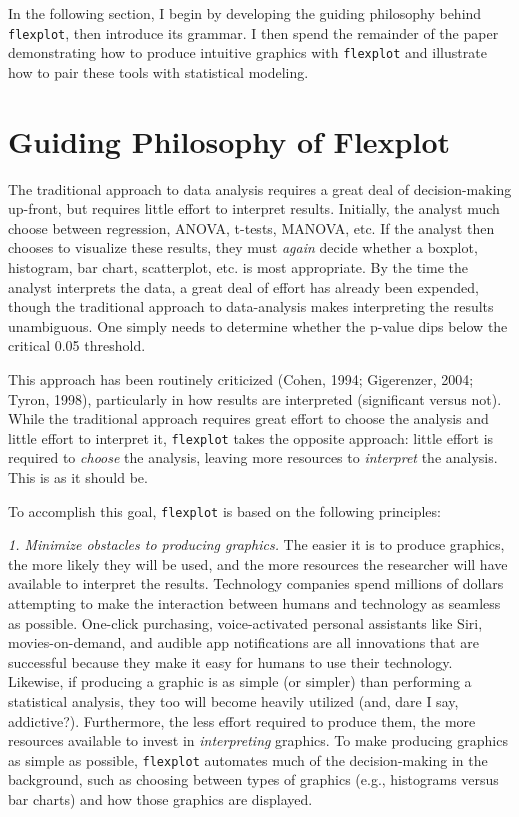 \documentclass[
  man]{apa6}
\begin{document}
In the following section, I begin by developing the guiding philosophy behind \texttt{flexplot}, then introduce its grammar. I then spend the remainder of the paper demonstrating how to produce intuitive graphics with \texttt{flexplot} and illustrate how to pair these tools with statistical modeling.

\hypertarget{guiding-philosophy-of-flexplot}{%
\section{Guiding Philosophy of Flexplot}\label{guiding-philosophy-of-flexplot}}

The traditional approach to data analysis requires a great deal of decision-making up-front, but requires little effort to interpret results. Initially, the analyst much choose between regression, ANOVA, t-tests, MANOVA, etc. If the analyst then chooses to visualize these results, they must \emph{again} decide whether a boxplot, histogram, bar chart, scatterplot, etc. is most appropriate. By the time the analyst interprets the data, a great deal of effort has already been expended, though the traditional approach to data-analysis makes interpreting the results unambiguous. One simply needs to determine whether the p-value dips below the critical 0.05 threshold.

This approach has been routinely criticized (Cohen, 1994; Gigerenzer, 2004; Tyron, 1998), particularly in how results are interpreted (significant versus not). While the traditional approach requires great effort to choose the analysis and little effort to interpret it, \texttt{flexplot} takes the opposite approach: little effort is required to \emph{choose} the analysis, leaving more resources to \emph{interpret} the analysis. This is as it should be.

To accomplish this goal, \texttt{flexplot} is based on the following principles:

\emph{1. Minimize obstacles to producing graphics.} The easier it is to produce graphics, the more likely they will be used, and the more resources the researcher will have available to interpret the results. Technology companies spend millions of dollars attempting to make the interaction between humans and technology as seamless as possible. One-click purchasing, voice-activated personal assistants like Siri, movies-on-demand, and audible app notifications are all innovations that are successful because they make it easy for humans to use their technology. Likewise, if producing a graphic is as simple (or simpler) than performing a statistical analysis, they too will become heavily utilized (and, dare I say, addictive?). Furthermore, the less effort required to produce them, the more resources available to invest in \emph{interpreting} graphics. To make producing graphics as simple as possible, \texttt{flexplot} automates much of the decision-making in the background, such as choosing between types of graphics (e.g., histograms versus bar charts) and how those graphics are displayed.
\end{document}

